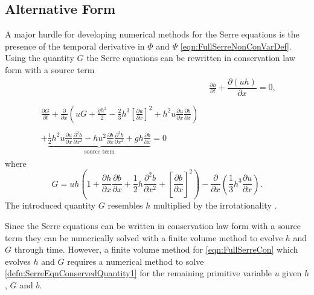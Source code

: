 \subsection{Alternative Form}
A major hurdle for developing numerical methods for the Serre equations is the presence of the temporal derivative in $\Phi$ and $\Psi$ \eqref{eqn:FullSerreNonConVarDef}. Using the quantity $G$ \cite{Hank-etal-2010-2034,Zoppou-2014,Li-2014-169} the Serre equations can be rewritten in conservation law form with a source term
\begin{subequations}
	\label{eqn:FullSerreCon}
	\begin{align}
	& \frac{\partial h}{\partial t} + \dfrac{\partial (uh)}{\partial x} = 0 ,\label{eqn:FullSerreConMass}  \\ \nonumber \\
	\begin{split}
	\label{eqn:Serreconsconmom}
	\frac{\partial G}{\partial t}  + \frac{\partial}{\partial x} \left( {u} G + \frac{gh^2}{2} - \frac{2}{3}h^3 \left[\frac{\partial {u}}{\partial x}\right]^2 + h^2 {u}\frac{\partial {u}}{\partial x}\frac{\partial b}{\partial x} \right) \\ \\ +  \underbrace{\frac{1}{2}h^2 {u} \frac{\partial {u}}{\partial x} \frac{\partial^2 b}{\partial x^2}  - h {u}^2\frac{\partial b}{\partial x}\frac{\partial^2 b}{\partial x^2} + gh\frac{\partial b}{\partial x} } _{\text{source term}} = 0
	\end{split}
	\end{align}
\end{subequations}
where
\begin{equation}
\label{defn:SerreEqnConservedQuantity1}
G =  {u}h \left(1 + \frac{\partial h}{\partial x}\frac{\partial b}{\partial x} + \frac{1}{2}h\frac{\partial^2 b}{\partial x^2} + \left[\frac{\partial b}{\partial x}\right]^2 \right) - \frac{\partial}{\partial x}\left(\frac{1}{3}h^3  \frac{\partial {u}}{\partial x}\right).
\end{equation}
The introduced quantity $G$ resembles $h$ multiplied by the irrotationality \cite{Choi-Camassa-1999-1,Carter-Cienfuegos-2011-259}.

Since the Serre equations can be written in conservation law form with a source term they can be numerically solved with a finite volume method to evolve $h$ and $G$ through time. However, a finite volume method for \eqref{eqn:FullSerreCon} which evolves $h$ and $G$ requires a numerical method to solve \eqref{defn:SerreEqnConservedQuantity1} for the remaining primitive variable $u$ given $h$, $G$ and $b$.

